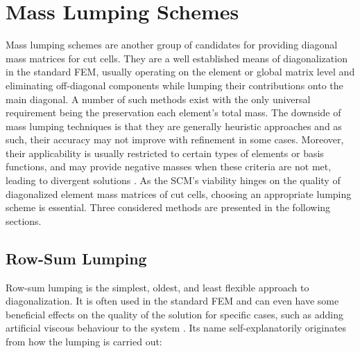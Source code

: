 %
\section{Mass Lumping Schemes}
\label{section:masslumpingschemes}
%

Mass lumping schemes are another group of candidates for providing diagonal mass
matrices for cut cells. They are a well established means of diagonalization
in the standard FEM, usually operating on the element or global matrix level
and eliminating off-diagonal components while lumping their contributions onto the
main diagonal. A number of such methods exist with the only universal requirement
being the preservation each element's total mass. The downside of mass lumping
techniques is that they are generally heuristic approaches and as such, their
accuracy may not improve with refinement in some cases. Moreover, their applicability is usually
restricted to certain types of elements or basis functions, and may provide negative
masses when these criteria are not met, leading to divergent solutions \cite{Duczek2019}.
As the SCM's viability hinges on the quality of diagonalized element mass matrices
of cut cells, choosing an appropriate lumping scheme is essential. Three considered
methods are presented in the following sections.

%
\subsection{Row-Sum Lumping}
\label{section:rowsumlumping}
%

Row-sum lumping is the simplest, oldest, and least flexible approach to diagonalization.
It is often used in the standard FEM and can even have some beneficial effects on the quality
of the solution for specific cases, such as adding artificial viscous behaviour to the system \cite{Hughes2000}.
Its name self-explanatorily originates from how the lumping is carried out:

